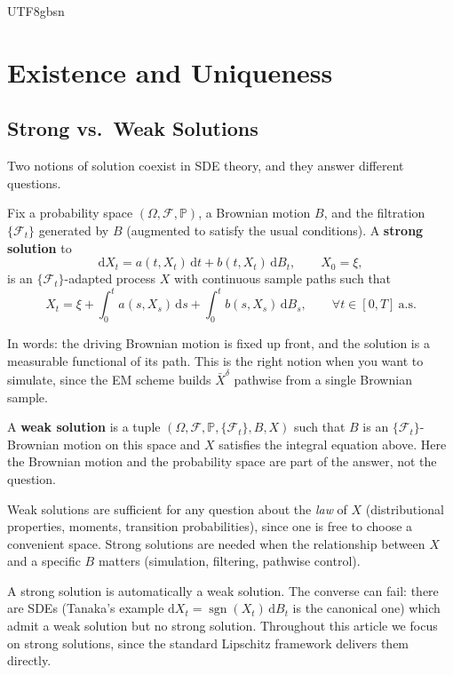 \documentclass{article}
\begin{document}
\begin{CJK*}{UTF8}{gbsn}
\section{Existence and Uniqueness}

\subsection{Strong vs.\ Weak Solutions}

Two notions of solution coexist in SDE theory, and they answer different questions.

\begin{definition}
Fix a probability space $(\Omega,\mathcal{F},\mathbb{P})$, a Brownian motion $B$, and the filtration $\{\mathcal{F}_t\}$ generated by $B$ (augmented to satisfy the usual conditions). A \textbf{strong solution} to
\begin{equation}\label{eq:sde}
    \mathrm{d}X_t=a(t,X_t)\,\mathrm{d}t+b(t,X_t)\,\mathrm{d}B_t,\qquad X_0=\xi,
\end{equation}
is an $\{\mathcal{F}_t\}$-adapted process $X$ with continuous sample paths such that
\[
  X_t=\xi+\int_0^t a(s,X_s)\,\mathrm{d}s+\int_0^t b(s,X_s)\,\mathrm{d}B_s,\qquad \forall t\in[0,T]\ \text{a.s.}
\]
\end{definition}

In words: the driving Brownian motion is fixed up front, and the solution is a measurable functional of its path. This is the right notion when you want to simulate, since the EM scheme builds $\bar{X}^\delta$ pathwise from a single Brownian sample.

\begin{definition}
A \textbf{weak solution} is a tuple $(\Omega,\mathcal{F},\mathbb{P},\{\mathcal{F}_t\},B,X)$ such that $B$ is an $\{\mathcal{F}_t\}$-Brownian motion on this space and $X$ satisfies the integral equation above. Here the Brownian motion and the probability space are part of the answer, not the question.
\end{definition}

Weak solutions are sufficient for any question about the \emph{law} of $X$ (distributional properties, moments, transition probabilities), since one is free to choose a convenient space. Strong solutions are needed when the relationship between $X$ and a specific $B$ matters (simulation, filtering, pathwise control).

A strong solution is automatically a weak solution. The converse can fail: there are SDEs (Tanaka's example $\mathrm{d}X_t=\operatorname{sgn}(X_t)\,\mathrm{d}B_t$ is the canonical one) which admit a weak solution but no strong solution. Throughout this article we focus on strong solutions, since the standard Lipschitz framework delivers them directly.


\end{CJK*}
\end{document}
